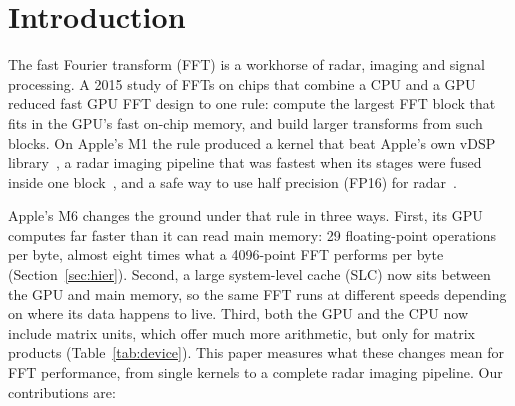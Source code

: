 \documentclass[conference]{IEEEtran}
\begin{document}
\section{Introduction}

The fast Fourier transform (FFT) is a workhorse of radar, imaging and signal processing. A 2015 study
of FFTs on chips that combine a CPU and a GPU~\cite{bergach2015thesis,bergach2014scaling,bergach2015conference}
reduced fast GPU FFT design to one rule: compute the largest FFT block that fits in the GPU's fast
on-chip memory, and build larger transforms from such blocks. On Apple's M1 the rule produced a kernel
that beat Apple's own vDSP library~\cite{bergach2026fft}, a radar imaging pipeline that was fastest
when its stages were fused inside one block~\cite{bergach2026sar}, and a safe way to use half precision
(FP16) for radar~\cite{bergach2026fp16}.

Apple's M6 changes the ground under that rule in three ways. First, its GPU computes far faster than
it can read main memory: 29 floating-point operations per byte, almost eight times what a 4096-point
FFT performs per byte (Section~\ref{sec:hier}). Second, a large system-level cache (SLC) now sits
between the GPU and main memory, so the same FFT runs at different speeds depending on where its data
happens to live. Third, both the GPU and the CPU now include matrix units, which offer much more
arithmetic, but only for matrix products (Table~\ref{tab:device}). This paper measures what these
changes mean for FFT performance, from single kernels to a complete radar imaging pipeline. Our
contributions are:
\end{document}
